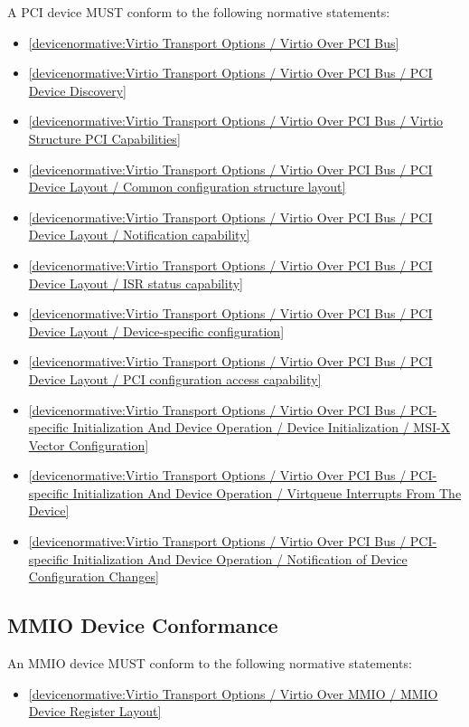 A PCI device MUST conform to the following normative statements:

\begin{itemize}
\item \ref{devicenormative:Virtio Transport Options / Virtio Over PCI Bus}
\item \ref{devicenormative:Virtio Transport Options / Virtio Over PCI Bus / PCI Device Discovery}
\item \ref{devicenormative:Virtio Transport Options / Virtio Over PCI Bus / Virtio Structure PCI Capabilities}
\item \ref{devicenormative:Virtio Transport Options / Virtio Over PCI Bus / PCI Device Layout / Common configuration structure layout}
\item \ref{devicenormative:Virtio Transport Options / Virtio Over PCI Bus / PCI Device Layout / Notification capability}
\item \ref{devicenormative:Virtio Transport Options / Virtio Over PCI Bus / PCI Device Layout / ISR status capability}
\item \ref{devicenormative:Virtio Transport Options / Virtio Over PCI Bus / PCI Device Layout / Device-specific configuration}
\item \ref{devicenormative:Virtio Transport Options / Virtio Over PCI Bus / PCI Device Layout / PCI configuration access capability}
\item \ref{devicenormative:Virtio Transport Options / Virtio Over PCI Bus / PCI-specific Initialization And Device Operation / Device Initialization / MSI-X Vector Configuration}
\item \ref{devicenormative:Virtio Transport Options / Virtio Over PCI Bus / PCI-specific Initialization And Device Operation / Virtqueue Interrupts From The Device}
\item \ref{devicenormative:Virtio Transport Options / Virtio Over PCI Bus / PCI-specific Initialization And Device Operation / Notification of Device Configuration Changes}
\end{itemize}

\subsection{MMIO Device Conformance}\label{sec:Conformance / Device Conformance / MMIO Device Conformance}

An MMIO device MUST conform to the following normative statements:

\begin{itemize}
\item \ref{devicenormative:Virtio Transport Options / Virtio Over MMIO / MMIO Device Register Layout}
\end{itemize}


